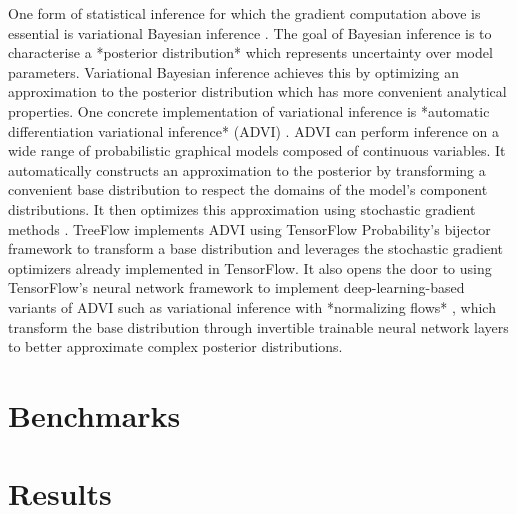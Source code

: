 One form of statistical inference for which the gradient computation above is essential is variational Bayesian inference \cite{jordan1999introduction}. The goal of Bayesian inference is to characterise a *posterior distribution* which represents uncertainty over model parameters. Variational Bayesian inference achieves this by optimizing an approximation to the posterior distribution which has more convenient analytical properties. One concrete implementation of variational inference is *automatic differentiation variational inference* (ADVI) \cite{kucukelbir2017automatic}. ADVI can perform inference on a wide range of probabilistic graphical models composed of continuous variables. It automatically constructs an approximation to the posterior by transforming a convenient base distribution to respect the domains of the model's component distributions. It then optimizes this approximation using stochastic gradient methods \cite{robbins1951stochastic, bottou2010large}. TreeFlow implements ADVI using TensorFlow Probability's bijector framework to transform a base distribution and leverages the stochastic gradient optimizers already implemented in TensorFlow. It also opens the door to using TensorFlow's neural network framework to implement deep-learning-based variants of ADVI such as variational inference with *normalizing flows* \cite{rezende2015variational}, which transform the base distribution through invertible trainable neural network layers to better approximate complex posterior distributions.


\section{Benchmarks}

\section{Results}


